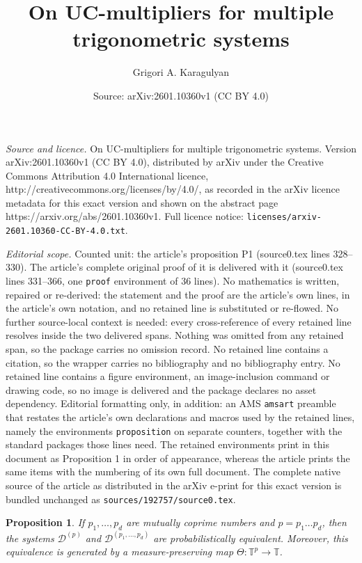 \documentclass[10pt,a4paper]{amsart}
\title{On UC-multipliers for multiple trigonometric systems}
\author{Grigori A. Karagulyan}
\date{Source: arXiv:2601.10360v1 (CC BY 4.0)}
\newtheorem{proposition}{Proposition}
\def\ZD{\ensuremath{\mathscr D}}
\def\ZT{\ensuremath{\mathbb T}}
\begin{document}
\maketitle

\noindent\emph{Source and licence.} On UC-multipliers for multiple trigonometric systems. Version arXiv:2601.10360v1 (CC BY 4.0), distributed by arXiv under the Creative Commons Attribution 4.0 International licence, http://creativecommons.org/licenses/by/4.0/, as recorded in the arXiv licence metadata for this exact version and shown on the abstract page https://arxiv.org/abs/2601.10360v1. Full licence notice: \texttt{licenses/arxiv-2601.10360-CC-BY-4.0.txt}.\par\smallskip

\noindent\textit{Editorial scope.} Counted unit: the article's proposition P1 (source0.tex lines 328--330). The article's complete original proof of it is delivered with it (source0.tex lines 331--366, one \texttt{proof} environment of 36 lines). No mathematics is written, repaired or re-derived: the statement and the proof are the article's own lines, in the article's own notation, and no retained line is substituted or re-flowed.  No further source-local context is needed: every cross-reference of every retained line resolves inside the two delivered spans.  Nothing was omitted from any retained span, so the package carries no omission record.  No retained line contains a citation, so the wrapper carries no bibliography and no bibliography entry.  No retained line contains a figure environment, an image-inclusion command or drawing code, so no image is delivered and the package declares no asset dependency.  Editorial formatting only, in addition: an AMS \texttt{amsart} preamble that restates the article's own declarations and macros used by the retained lines, namely the environments \texttt{proposition} on separate counters, together with the standard packages those lines need.  The retained environments print in this document as Proposition 1 in order of appearance, whereas the article prints the same items with the numbering of its own full document.  The complete native source of the article as distributed in the arXiv e-print for this exact version is bundled unchanged as \texttt{sources/192757/source0.tex}.
\begin{proposition}\label{P1}
	If $p_1,\ldots, p_d$ are mutually coprime numbers and $p=p_1\ldots p_d$, then the  systems $\ZD^{(p)}$ and $\ZD^{(p_1,\ldots,p_d)}$ are probabilistically equivalent. Moreover, this equivalence is generated by a measure-preserving map $\Theta:\ZT^p\to \ZT$.
\end{proposition}
\end{document}
